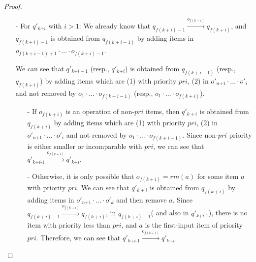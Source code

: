 \begin {proof}
\begin{itemize}
    \begin{itemize}
    \setlength{\itemsep}{0.5pt}
    \item[-] If $o_{f(k+1)}$ is an operation of non-$\textit{pri}$ items, then $q'_{k+1}$ is obtained from $q_{f(k+1)}$ by adding items in $o'_{\textit{n+1}} \cdot \ldots \cdot o'_i$. Since non-$\textit{pri}$ priority is either smaller or incomparable with $\textit{pri}$, we can see that $q'_k \xrightarrow{o_{f(k+1)}} q'_{\textit{k+1}}$.

    \item[-] Otherwise, it is only possible that $o_{f(k+1)} = \textit{rm}(a)$ for some item $a$ with priority $\textit{pri}$. We can see that $q'_{k+1}$ is obtained from $q_{f(k+1)}$ by adding items in $o'_{\textit{n+1}} \cdot \ldots \cdot o'_k$ and then remove $a$. Since $q_{f(k+1)-1} \xrightarrow{o_{f(k+1)}} q_{f(k+1)}$, in $q_{f(k+1)-1}$( and also in $q'_k$), there is no item with priority less than $\textit{pri}$, and $a$ is the first-input item of priority $\textit{pri}$. Therefore, we can see that $q'_k \xrightarrow{o_{f(k+1)}} q'_{\textit{k+1}}$.
    \end{itemize}

\item[-] For $q'_{\textit{k+i}}$ with $i>1$: We already know that $q_{f(k+i)-1} \xrightarrow{o_{f(k+i)}} q_{f(k+i)}$, and $q_{f(k+i)-1}$ is obtained from $q_{f(k+i-1)}$ by adding items in $o_{f(k+i-1)+1} \cdot \ldots \cdot o_{f(k+i)-1}$.

    We can see that $q'_{\textit{k+i}-1}$ (resp., $q'_{\textit{k+i}}$) is obtained from $q_{f(k+i-1)}$ (resp., $q_{f(k+i)}$) by adding items which are (1) with priority $\textit{pri}$, (2) in $o'_{\textit{n+1}} \cdot \ldots \cdot o'_i$ and not removed by $o_1 \cdot \ldots \cdot o_{f(k+i-1)}$ (resp., $o_1 \cdot \ldots \cdot o_{f(k+i)}$).

    \begin{itemize}
    \setlength{\itemsep}{0.5pt}
    \item[-] If $o_{f(k+i)}$ is an operation of non-$\textit{pri}$ items, then $q'_{k+i}$ is obtained from $q_{f(k+i)}$ by adding items which are (1) with priority $\textit{pri}$, (2) in $o'_{\textit{n+1}} \cdot \ldots \cdot o'_i$ and not removed by $o_1 \cdot \ldots \cdot o_{f(k+i-1)}$. Since non-$\textit{pri}$ priority is either smaller or incomparable with $\textit{pri}$, we can see that $q'_{\textit{k+i-1}} \xrightarrow{o_{f(k+i)}} q'_{\textit{k+i}}$.

    \item[-] Otherwise, it is only possible that $o_{f(k+i)} = \textit{rm}(a)$ for some item $a$ with priority $\textit{pri}$. We can see that $q'_{k+i}$ is obtained from $q_{f(k+i)}$ by adding items in $o'_{\textit{n+1}} \cdot \ldots \cdot o'_k$ and then remove $a$. Since $q_{f(k+i)-1} \xrightarrow{o_{f(k+i)}} q_{f(k+i)}$, in $q_{f(k+i)-1}$( and also in $q'_{\textit{k+i-1}}$), there is no item with priority less than $\textit{pri}$, and $a$ is the first-input item of priority $\textit{pri}$. Therefore, we can see that $q'_{\textit{k+i-1}} \xrightarrow{o_{f(k+i)}} q'_{\textit{k+i}}$.
    \end{itemize}
\end{itemize}


\end{proof}
